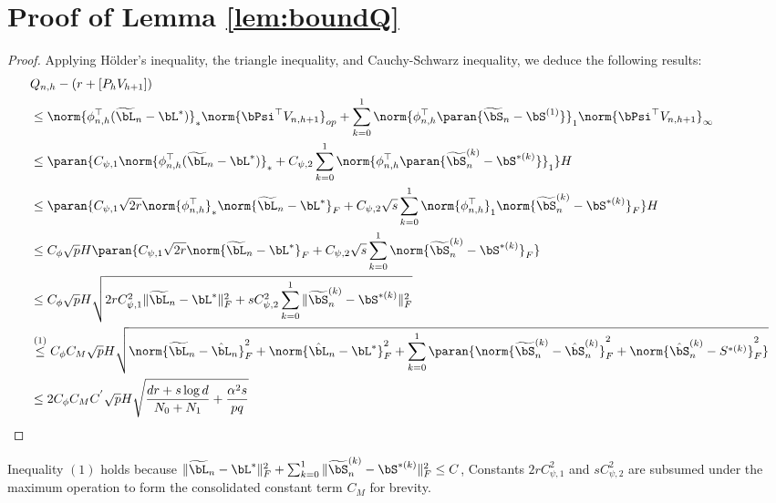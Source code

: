 \section*{Proof of Lemma \ref{lem:boundQ} } 
\label{A:4}
\begin{proof}
        Applying Hölder's inequality, the triangle inequality, and Cauchy-Schwarz inequality, we deduce the following results:
     \begin{equation}
     \begin{aligned}
     &Q_{n,h} - \left(r + [P_h V_{h+1}]\right) \\
     &\leq \norm{\phi_{n, h}^{\top}(\widetilde{\bL}_{n} - \bL^{*})}_*\norm{\bPsi^{\top} V_{n, h+1}}_{op}+\sum_{k=0}^1\norm{\phi_{n, h}^{\top}\paran{\widetilde{\bS}_{n} - \bS^{(1)}}}_1\norm{\bPsi^{\top} V_{n, h+1}}_{\infty} \\
     & \leq \paran{C_{\psi,1}\norm{\phi_{n, h}^{\top}(\widetilde{\bL}_{n} - \bL^*)}_*+C_{\psi,2}\sum_{k=0}^1\norm{\phi_{n, h}^{\top}\paran{\widetilde{\bS}_{n}^{(k)} - \bS^{*(k)}}}_1}H \\
     & \leq \paran{C_{\psi,1}\sqrt{2r}\norm{\phi_{n, h}^{\top}}_*\norm{\widetilde{\bL}_{n} - \bL^{*}}_F + C_{\psi,2}\sqrt{s}\sum_{k=0}^1\norm{\phi_{n, h}^{\top}}_1\norm{\widetilde{\bS}_{n}^{(k)} - \bS^{*(k)}}_F}H \\
     & \leq C_{\phi}\sqrt{p}H\paran{C_{\psi,1}\sqrt{2r}\norm{\widetilde{\bL}_{n} - \bL^*}_F + C_{\psi,2}\sqrt{s}\sum_{k=0}^1
     \norm{\widetilde{\bS}_{n}^{(k)} - \bS^{*(k)}}_F} \\
     & \leq C_{\phi}\sqrt{p}H \sqrt{2rC_{\psi,1}^2 \|\widetilde{\bL}_{n} - \bL^*\|_F^2 + sC_{\psi,2}^2 \sum_{k=0}^1 \|\widetilde{\bS}_{n}^{(k)} - \bS^{*(k)}\|_F^2}\\
     & \overset{(1)}{\leq}C_{\phi}C_{M}\sqrt{p}H
     \sqrt{
     \norm{\widetilde{\bL}_n -\hat\bL_n}^2_F + 
     \norm{\hat\bL_n -\bL^*}^2_F+\sum_{k=0}^1\paran{\norm{\widetilde{\bS}_{n}^{(k)} - \hat\bS_n^{(k)}}^2_F+\norm{\hat\bS_n^{(k)} - S^{*(k)}}^2_F}} \\
     & \leq 2C_{\phi}C_{M}C^{'} \sqrt{p}H\sqrt{\frac{dr+s\log d}{N_0+N_1}+\frac{\alpha^2s}{pq}}
     \end{aligned}
    \end{equation}
\end{proof}

Inequality $(1)$ holds because $\|\widetilde{\bL}_{n} - \bL^*\|_F^2 + \sum_{k=0}^1 \|\widetilde{\bS}_{n}^{(k)} - \bS^{*(k)}\|_F^2 \leq C$, Constants $2rC_{\psi,1}^2$ and $sC_{\psi,2}^2$ are subsumed under the maximum operation to form the consolidated constant term $C_M$ for brevity.
 
    
   